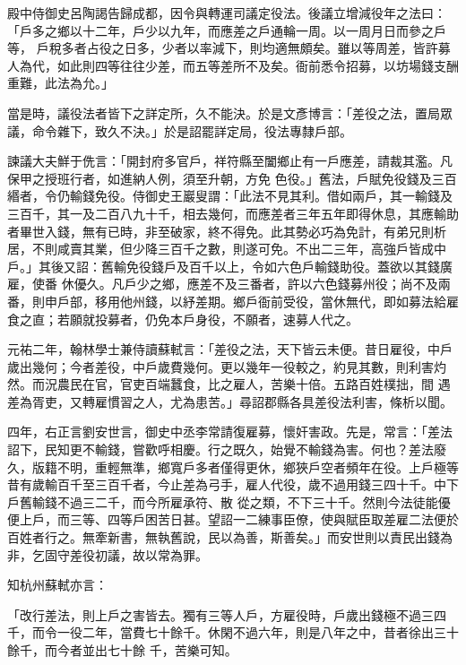 \begin{pinyinscope}
 殿中侍御史呂陶謁告歸成都，因令與轉運司議定役法。後議立增減役年之法曰：「戶多之鄉以十二年，戶少以九年，而應差之戶通輪一周。以一周月日而參之戶等，
 戶稅多者占役之日多，少者以率減下，則均適無頗矣。雖以等周差，皆許募人為代，如此則四等往往少差，而五等差所不及矣。衙前悉令招募，以坊場錢支酬重難，此法為允。」



 當是時，議役法者皆下之詳定所，久不能決。於是文彥博言：「差役之法，置局眾議，命令雜下，致久不決。」於是詔罷詳定局，役法專隸戶部。



 諫議大夫鮮于侁言：「開封府多官戶，祥符縣至闔鄉止有一戶應差，請裁其濫。凡保甲之授班行者，如進納人例，須至升朝，方免
 色役。」舊法，戶賦免役錢及三百緡者，令仍輸錢免役。侍御史王巖叟謂：「此法不見其利。借如兩戶，其一輸錢及三百千，其一及二百八九十千，相去幾何，而應差者三年五年即得休息，其應輸助者畢世入錢，無有已時，非至破家，終不得免。此其勢必巧為免計，有弟兄則析居，不則咸賣其業，但少降三百千之數，則遂可免。不出二三年，高強戶皆成中戶。」其後又詔：舊輸免役錢戶及百千以上，令如六色戶輸錢助役。蓋欲以其錢廣雇，使番
 休優久。凡戶少之鄉，應差不及三番者，許以六色錢募州役；尚不及兩番，則申戶部，移用他州錢，以紓差期。鄉戶衙前受役，當休無代，即如募法給雇食之直；若願就投募者，仍免本戶身役，不願者，速募人代之。



 元祐二年，翰林學士兼侍讀蘇軾言：「差役之法，天下皆云未便。昔日雇役，中戶歲出幾何；今者差役，中戶歲費幾何。更以幾年一役較之，約見其數，則利害灼然。而況農民在官，官吏百端蠶食，比之雇人，苦樂十倍。五路百姓樸拙，間
 遇差為胥吏，又轉雇慣習之人，尤為患苦。」尋詔郡縣各具差役法利害，條析以聞。



 四年，右正言劉安世言，御史中丞李常請復雇募，懷奸害政。先是，常言：「差法詔下，民知更不輸錢，嘗歡呼相慶。行之既久，始覺不輸錢為害。何也？差法廢久，版籍不明，重輕無準，鄉寬戶多者僅得更休，鄉狹戶空者頻年在役。上戶極等昔有歲輸百千至三百千者，今止差為弓手，雇人代役，歲不過用錢三四十千。中下戶舊輸錢不過三二千，而今所雇承符、散
 從之類，不下三十千。然則今法徒能優便上戶，而三等、四等戶困苦日甚。望詔一二練事臣僚，使與賦臣取差雇二法便於百姓者行之。無牽新書，無執舊說，民以為善，斯善矣。」而安世則以責民出錢為非，乞固守差役初議，故以常為罪。



 知杭州蘇軾亦言：



 「改行差法，則上戶之害皆去。獨有三等人戶，方雇役時，戶歲出錢極不過三四千，而令一役二年，當費七十餘千。休閑不過六年，則是八年之中，昔者徐出三十餘千，而今者並出七十餘
 千，苦樂可知。




\end{pinyinscope}
